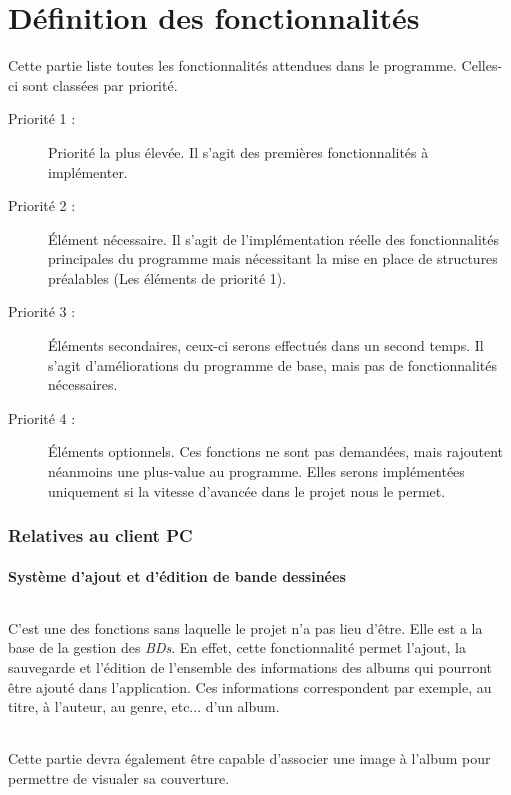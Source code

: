 \part{Définition des fonctionnalités}
Cette partie liste toutes les fonctionnalités attendues dans le programme. Celles-ci sont classées par priorité.

\begin{description}
\item [Priorité 1 :]
	Priorité la plus élevée. Il s'agit des premières fonctionnalités à implémenter.

\item [Priorité 2 :]
	Élément nécessaire. Il s'agit de l'implémentation réelle des fonctionnalités principales du programme mais nécessitant la mise en place de structures préalables (Les éléments de priorité 1). 

\item [Priorité 3 :]
	Éléments secondaires, ceux-ci serons effectués dans un second temps. Il s'agit d'améliorations du programme de base, mais pas de fonctionnalités nécessaires.  

\item [Priorité 4 :]
	Éléments optionnels. Ces fonctions ne sont pas demandées, mais rajoutent néanmoins une plus-value au programme. Elles serons implémentées uniquement si la vitesse d'avancée dans le projet nous le permet.
\end{description}


\section{Relatives au client PC}

\subsection{Système d'ajout et d'édition de bande dessinées}
\paragraph{}
C'est une des fonctions sans laquelle le projet n'a pas lieu d'être. Elle est a la base de la gestion des \emph{BDs}. En effet, cette fonctionnalité permet l'ajout, la sauvegarde et l'édition de l'ensemble des informations des albums qui pourront être ajouté dans l'application. Ces informations correspondent par exemple, au titre, à l'auteur, au genre, etc... d'un album.
\paragraph{}  
Cette partie devra également être capable d'associer une image à l'album pour permettre de visualer sa couverture.
